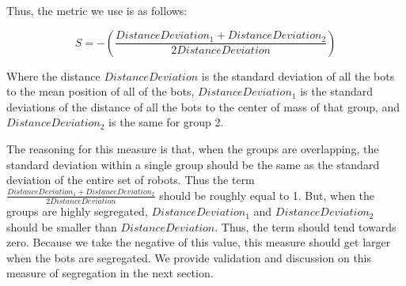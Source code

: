 Thus, the metric we use is as follows:

$$
S = -({\frac{DistanceDeviation_1 + DistanceDeviation_2}{2 DistanceDeviation}})
$$

Where the distance $DistanceDeviation$ is the standard deviation of all the bots to the mean position of all of the bots, $DistanceDeviation_1$ is the standard deviations of the distance of all the bots to the center of mass of that group, and $DistanceDeviation_2$ is the same for group 2. 

The reasoning for this measure is that, when the groups are overlapping, the standard deviation within a single group should be the same as the standard deviation of the entire set of robots. 
Thus the term $\frac{DistanceDeviation_1 + DistanceDeviation_2}{2 DistanceDeviation}$ should be roughly equal to 1. 
But, when the groups are highly segregated, $DistanceDeviation_1$ and $DistanceDeviation_2$ should be smaller than $DistanceDeviation$. 
Thus, the term should tend towards zero. 
Because we take the negative of this value, this measure should get larger when the bots are segregated. 
We provide validation and discussion on this measure of segregation in the next section.
